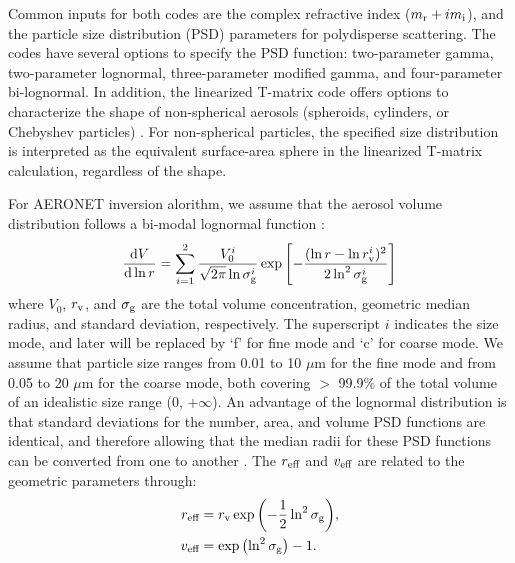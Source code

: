 Common inputs for both codes are the complex refractive index
($m_\text{r} + im_\text{i}$), and the particle size distribution (PSD) 
parameters for polydisperse scattering. The codes have several options 
to specify the PSD function: two-parameter gamma, two-parameter 
lognormal, three-parameter modified gamma, and four-parameter bi-lognormal. 
In addition, the linearized T-matrix code offers options to characterize the 
shape of non-spherical aerosols (spheroids, cylinders, or Chebyshev particles)
\citep{Spurr12}. For non-spherical particles, the specified size distribution 
is interpreted as the equivalent surface-area sphere in the linearized T-matrix
calculation, regardless of the shape. 

For AERONET inversion alorithm, we assume that the aerosol volume
distribution follows a bi-modal lognormal function \citep[in agreement
wit][]{Schuster06, Waquet09}:
\begin{equation}
\frac{\text{d}V}{\text{d}\ln{r}} = \sum_{i=1}^2 
\frac{V_0^i}{\sqrt{2\pi}\ln{\sigma_\text{g}^i}} 
\exp{\left[ -\frac{(\ln{r}-\ln{r_\text{v}^i})^2}{2\ln^2{\sigma_\text{g}^i}}\right]}
\label{eq:bilognormal}
\end{equation}
where $V_0$, $r_\text{v}$, and $\sigma_\text{g}$ are the total volume concentration, geometric
median radius, and standard deviation, respectively. The superscript $i$
indicates the size mode, and later will be replaced by ‘f’ for fine mode
and ‘c’ for coarse mode. We assume that particle size ranges from 0.01
to 10 $\mu$m for the fine mode and from 0.05 to 20 $\mu$m for
the coarse mode, both covering $>$ 99.9\% of the total volume of an 
idealistic size range (0, $+\infty$). An advantage of the lognormal 
distribution is that standard deviations for the number, area, and 
volume PSD functions are identical, and therefore allowing that the 
median radii for these PSD functions can be converted from one to 
another \citep{Seinfeld06}. The $r_\text{eff}$ and $v_\text{eff}$ are related to 
the geometric parameters through:
\begin{align}
r_\text{eff} &= r_\text{v} \exp{\left( -\frac{1}{2} \ln^2{\sigma_\text{g}}\right)}, \\
v_\text{eff} & = \exp{\left(\ln^2{\sigma_\text{g}}\right)} - 1.
\end{align}

